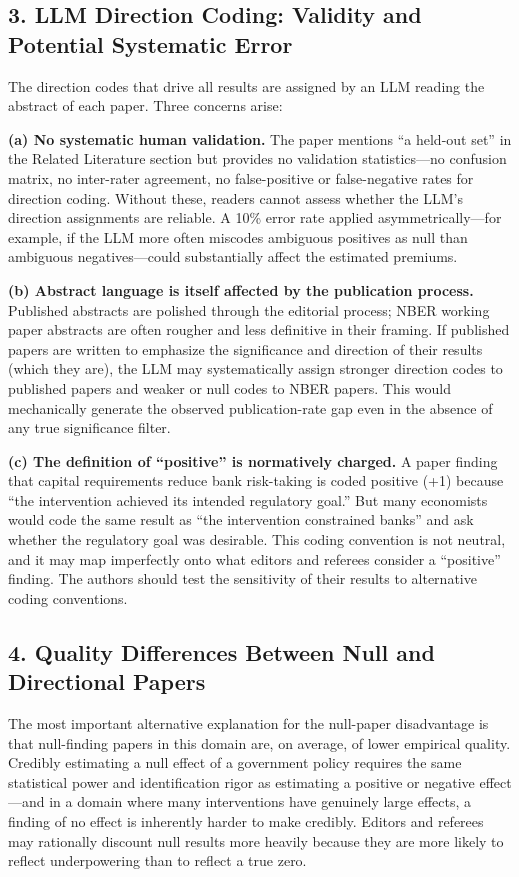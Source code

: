 \documentclass[12pt]{article}
\begin{document}
\subsection*{3. LLM Direction Coding: Validity and Potential Systematic Error}

The direction codes that drive all results are assigned by an LLM reading
the abstract of each paper.  Three concerns arise:

\textbf{(a) No systematic human validation.}  The paper mentions ``a
held-out set'' in the Related Literature section but provides no validation
statistics---no confusion matrix, no inter-rater agreement, no false-positive
or false-negative rates for direction coding.  Without these, readers cannot
assess whether the LLM's direction assignments are reliable.  A 10\% error
rate applied asymmetrically---for example, if the LLM more often miscodes
ambiguous positives as null than ambiguous negatives---could substantially
affect the estimated premiums.

\textbf{(b) Abstract language is itself affected by the publication process.}
Published abstracts are polished through the editorial process; NBER working
paper abstracts are often rougher and less definitive in their framing.  If
published papers are written to emphasize the significance and direction of
their results (which they are), the LLM may systematically assign stronger
direction codes to published papers and weaker or null codes to NBER papers.
This would mechanically generate the observed publication-rate gap even in the
absence of any true significance filter.

\textbf{(c) The definition of ``positive'' is normatively charged.}  A paper
finding that capital requirements reduce bank risk-taking is coded positive
(+1) because ``the intervention achieved its intended regulatory goal.''  But
many economists would code the same result as ``the intervention constrained
banks'' and ask whether the regulatory goal was desirable.  This coding
convention is not neutral, and it may map imperfectly onto what editors and
referees consider a ``positive'' finding.  The authors should test the
sensitivity of their results to alternative coding conventions.

\subsection*{4. Quality Differences Between Null and Directional Papers}

The most important alternative explanation for the null-paper disadvantage
is that null-finding papers in this domain are, on average, of lower empirical
quality.  Credibly estimating a null effect of a government policy requires
the same statistical power and identification rigor as estimating a positive
or negative effect---and in a domain where many interventions have genuinely
large effects, a finding of no effect is inherently harder to make credibly.
Editors and referees may rationally discount null results more heavily because
they are more likely to reflect underpowering than to reflect a true zero.
\end{document}
